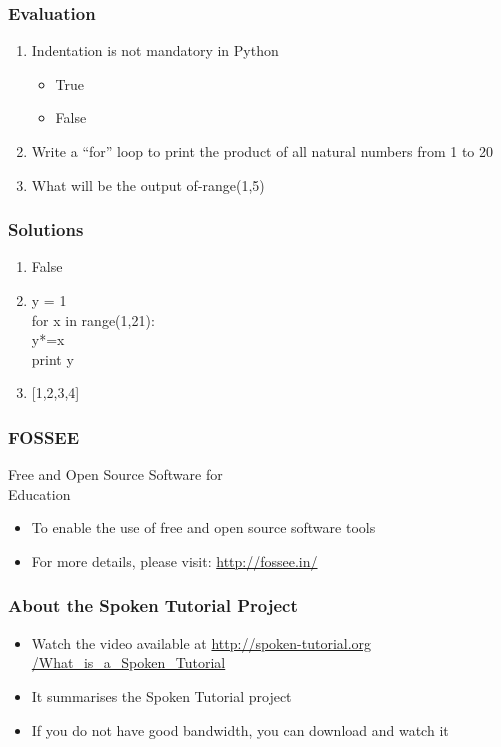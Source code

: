 \documentclass[17pt]{beamer}
\begin{document}
\begin{frame}
\frametitle{Evaluation}
\begin{enumerate}
    \item Indentation is not mandatory in Python
    \begin{itemize}
        \item True
        \item False
    \end{itemize}
    \vspace{8pt}
    \item Write a ``for'' loop to print the product of all natural numbers from 1 to 20
    \vspace{8pt}
    \item What will be the output of-range(1,5)
\end{enumerate}
\end{frame}
\begin{frame}
\frametitle{Solutions}
\begin{enumerate}
    \item False
    \vspace{8pt}
    \item y = 1\\
    for x in range(1,21):\\
    \hspace{12pt}
              y*=x\\
        print y 
    \vspace{8pt}      
    \item {[1,2,3,4]}
\end{enumerate}
\end{frame}
\begin{frame}
\frametitle{FOSSEE}
{\color{NavyBlue}Free and Open Source Software for \\Education} \\
\begin{itemize}
\item To enable the use of free and open source software tools
\item For more details, please visit: {\color{blue}\url{http://fossee.in/}}
\end{itemize}
\end{frame}
\begin{frame}
\frametitle{About the Spoken Tutorial Project}
\begin{itemize}
\item Watch the video available at {\color{blue}\url{http://spoken-tutorial.org /What\_is\_a\_Spoken\_Tutorial}} 
\item It summarises the Spoken Tutorial project 
\item If you do not have good bandwidth, you can download and watch it
\end{itemize}
\end{frame}
\end{document}
